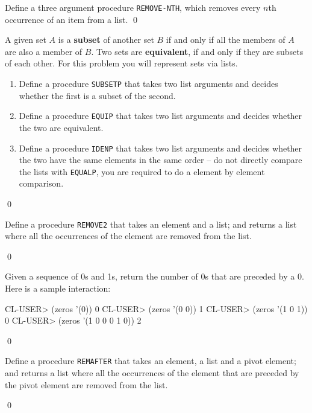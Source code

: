 \documentclass[a4paper,11pt]{article}
\begin{document}
\begin{uexercise}
Define a three argument procedure \Verb+REMOVE-NTH+, which removes every $n$th occurrence of an item from a list.
\qed
\end{uexercise}


\begin{uexercise}
A given set $A$ is a {\bf subset} of another set $B$ if and only if all the members of $A$ are also a member of $B$. Two sets are {\bf equivalent}, if and only if they are subsets of each other. For this problem you will represent sets via lists.

\begin{enumerate}
\item Define a procedure \Verb+SUBSETP+ that takes two list arguments and decides whether the first is a subset of the second.
\item Define a procedure \Verb+EQUIP+ that takes two list arguments and decides whether the two are equivalent.
\item Define a procedure \Verb+IDENP+ that takes two list arguments and decides whether the two have the same elements in the same order -- do not directly compare the lists with \Verb+EQUALP+, you are required to do a element by element comparison.
\end{enumerate}

\qed
\end{uexercise}

\begin{uexercise}
Define a procedure \Verb+REMOVE2+ that takes an element and a list; and returns a list where all the occurrences of the element are removed from the list.

\qed
\end{uexercise}

\begin{uexercise}[*]
 Given a sequence of 0s and 1s, return the number of 0s that
are preceded by a 0. Here is a sample interaction:

\begin{lispcode}
CL-USER> (zeros '(0))
0
CL-USER> (zeros '(0 0))
1
CL-USER> (zeros '(1 0 1))
0
CL-USER> (zeros '(1 0 0 0 1 0))
2
\end{lispcode}

\qed
\end{uexercise}

\begin{uexercise}
Define a procedure \Verb+REMAFTER+  that takes an element, a list and
a pivot element; and returns a list where all the occurrences of the
element that are preceded by the pivot element are removed from the list.

\qed
\end{uexercise}
\end{document}
